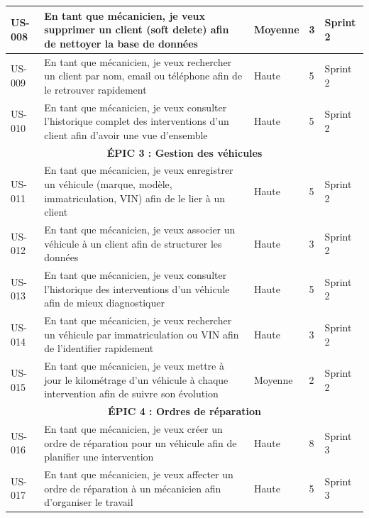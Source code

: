 \begin{longtable}{|p{1cm}|p{5.5cm}|p{1.8cm}|p{1.5cm}|p{1.5cm}|}
US-008 & En tant que mécanicien, je veux supprimer un client (soft delete) afin de nettoyer la base de données & Moyenne & 3 & Sprint 2 \\
\hline

US-009 & En tant que mécanicien, je veux rechercher un client par nom, email ou téléphone afin de le retrouver rapidement & Haute & 5 & Sprint 2 \\
\hline

US-010 & En tant que mécanicien, je veux consulter l'historique complet des interventions d'un client afin d'avoir une vue d'ensemble & Haute & 5 & Sprint 2 \\
\hline

\multicolumn{5}{|c|}{\cellcolor{gray!20}\textbf{ÉPIC 3 : Gestion des véhicules}} \\
\hline

US-011 & En tant que mécanicien, je veux enregistrer un véhicule (marque, modèle, immatriculation, VIN) afin de le lier à un client & Haute & 5 & Sprint 2 \\
\hline

US-012 & En tant que mécanicien, je veux associer un véhicule à un client afin de structurer les données & Haute & 3 & Sprint 2 \\
\hline

US-013 & En tant que mécanicien, je veux consulter l'historique des interventions d'un véhicule afin de mieux diagnostiquer & Haute & 5 & Sprint 2 \\
\hline

US-014 & En tant que mécanicien, je veux rechercher un véhicule par immatriculation ou VIN afin de l'identifier rapidement & Haute & 3 & Sprint 2 \\
\hline

US-015 & En tant que mécanicien, je veux mettre à jour le kilométrage d'un véhicule à chaque intervention afin de suivre son évolution & Moyenne & 2 & Sprint 2 \\
\hline

\multicolumn{5}{|c|}{\cellcolor{gray!20}\textbf{ÉPIC 4 : Ordres de réparation}} \\
\hline

US-016 & En tant que mécanicien, je veux créer un ordre de réparation pour un véhicule afin de planifier une intervention & Haute & 8 & Sprint 3 \\
\hline

US-017 & En tant que mécanicien, je veux affecter un ordre de réparation à un mécanicien afin d'organiser le travail & Haute & 5 & Sprint 3 \\
\hline


\end{longtable}
